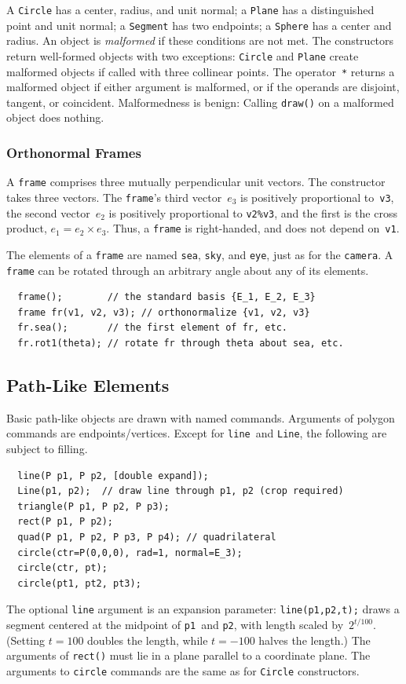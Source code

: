 \documentclass[12pt,letterpaper]{book}
\newcommand{\code}[1]{\texttt{#1}}
\newcommand{\teximath}[1]{$#1$}
\newcommand{\findex}[1]{\ignorespaces}
\begin{document}
A \code{Circle} has a center, radius, and unit normal; a \code{Plane}
has a distinguished point and unit normal; a \code{Segment} has two
endpoints; a \code{Sphere} has a center and radius. An object is
\emph{malformed} if these conditions are not met.  The constructors
return well-formed objects with two exceptions: \code{Circle} and
\code{Plane} create malformed objects if called with three collinear
points.  The operator~\code{*} returns a malformed object if either
argument is malformed, or if the operands are disjoint, tangent, or
coincident.  Malformedness is benign: Calling \code{draw()} on a
malformed object does nothing.


\subsubsection*{Orthonormal Frames}

A \code{frame} comprises three mutually perpendicular unit
vectors. The constructor takes three vectors. The \code{frame}'s third
vector~\teximath{e_3} is positively proportional to~\code{v3}, the
second vector~\teximath{e_2} is positively proportional to
\code{v2\%v3}, and the first is the cross product,
\teximath{e_1=e_2\times e_3}. Thus, a \code{frame} is right-handed,
and does not depend on~\code{v1}. 

The elements of a \code{frame} are named \code{sea}, \code{sky}, and
\code{eye}, just as for the \code{camera}. A \code{frame} can be
rotated through an arbitrary angle about any of its elements.
\findex{frame}
\begin{verbatim}
  frame();        // the standard basis {E_1, E_2, E_3}
  frame fr(v1, v2, v3); // orthonormalize {v1, v2, v3}
  fr.sea();       // the first element of fr, etc.
  fr.rot1(theta); // rotate fr through theta about sea, etc.
\end{verbatim}


\subsection{Path-Like Elements}

Basic path-like objects are drawn with named commands. Arguments of
polygon commands are endpoints/vertices. Except for \code{line}~and
\code{Line}, the following are subject to filling.
\findex{line}
\findex{Line}
\findex{triangle}
\findex{rect}
\findex{quad}
\findex{circle}
\begin{verbatim}
  line(P p1, P p2, [double expand]);
  Line(p1, p2);  // draw line through p1, p2 (crop required)
  triangle(P p1, P p2, P p3);
  rect(P p1, P p2);
  quad(P p1, P p2, P p3, P p4); // quadrilateral
  circle(ctr=P(0,0,0), rad=1, normal=E_3);
  circle(ctr, pt);
  circle(pt1, pt2, pt3);
\end{verbatim}
The optional \code{line} argument is an expansion parameter:
\code{line(p1,p2,t);} draws a segment centered at the midpoint of
\code{p1}~and \code{p2}, with length scaled
by~\teximath{2^{t/100}}. (Setting \teximath{t=100} doubles the length,
while \teximath{t=-100} halves the length.) The arguments of
\code{rect()} must lie in a plane parallel to a coordinate plane. The
arguments to \code{circle} commands are the same as for \code{Circle}
constructors.
\end{document}
